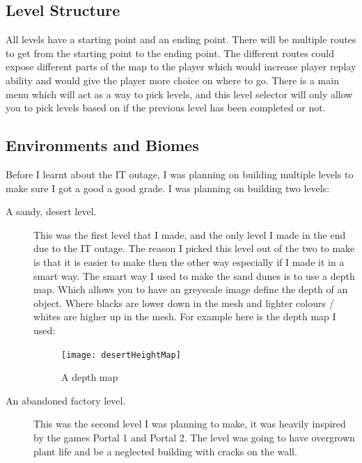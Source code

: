 \documentclass[12pt]{article}
\begin{document}
	\subsection{Level Structure}
	All levels have a starting point and an ending point. There will be multiple routes to get from the starting point to the ending point. The different routes could expose different parts of the map to the player which would increase player replay ability and would give the player more choice on where to go. There is a main menu which will act as a way to pick levels, and this level selector will only allow you to pick levels based on if the previous level has been completed or not.


	\subsection{Environments and Biomes}
	Before I learnt about the IT outage, I was planning on building multiple levels to make sure I got a good a good grade. I was planning on building two levels:
	\begin{description}
	  \item[A sandy, desert level.] This was the first level that I made, and the only level I made in the end due to the IT outage. The reason I picked this level out of the two to make is that it is easier to make then the other way especially if I made it in a smart way. The smart way I used to make the sand dunes is to use a depth map. Which allows you to have an greyscale image define the depth of an object. Where blacks are lower down in the mesh and lighter colours / whites are higher up in the mesh. For example here is the depth map I used:
			\begin{figure}[h]
			  \texttt{[image: desertHeightMap]}
			  \centering
			  \caption{A depth map}
			\end{figure}
	  \item[An abandoned factory level.] This was the second level I was planning to make, it was heavily inspired by the games Portal 1 and Portal 2. The level was going to have overgrown plant life and be a neglected building with cracks on the wall.
	\end{description}
	
	
	
	
	\newpage
	{\setlength{\parskip}{0pt}%
	
	}
	
\end{document}

